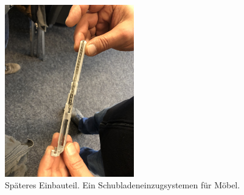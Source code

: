 \begin{figure}[H]
        \centering
        \includegraphics[width=0.5\textwidth]{bilder/fotos/schublade.JPEG}
        \caption{Späteres Einbauteil. Ein Schubladeneinzugsystemen für Möbel.}
        \label{fig:schublade}
\end{figure}